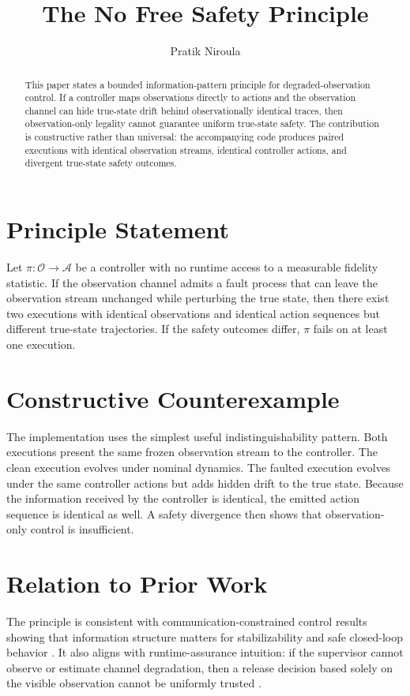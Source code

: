 \documentclass[conference]{IEEEtran}
\title{The No Free Safety Principle}
\author{Pratik Niroula}
\begin{document}
\maketitle

\begin{abstract}
This paper states a bounded information-pattern principle for degraded-observation control. If a controller maps observations directly to actions and the observation channel can hide true-state drift behind observationally identical traces, then observation-only legality cannot guarantee uniform true-state safety. The contribution is constructive rather than universal: the accompanying code produces paired executions with identical observation streams, identical controller actions, and divergent true-state safety outcomes.
\end{abstract}

\section{Principle Statement}
Let $\pi : \mathcal{O} \to \mathcal{A}$ be a controller with no runtime access to a measurable fidelity statistic. If the observation channel admits a fault process that can leave the observation stream unchanged while perturbing the true state, then there exist two executions with identical observations and identical action sequences but different true-state trajectories. If the safety outcomes differ, $\pi$ fails on at least one execution.

\section{Constructive Counterexample}
The implementation uses the simplest useful indistinguishability pattern. Both executions present the same frozen observation stream to the controller. The clean execution evolves under nominal dynamics. The faulted execution evolves under the same controller actions but adds hidden drift to the true state. Because the information received by the controller is identical, the emitted action sequence is identical as well. A safety divergence then shows that observation-only control is insufficient.

\section{Relation to Prior Work}
The principle is consistent with communication-constrained control results showing that information structure matters for stabilizability and safe closed-loop behavior \cite{nair2004stabilizability,tatikonda2004control}. It also aligns with runtime-assurance intuition: if the supervisor cannot observe or estimate channel degradation, then a release decision based solely on the visible observation cannot be uniformly trusted \cite{sha1998simplex,sha2001using}.
\end{document}
